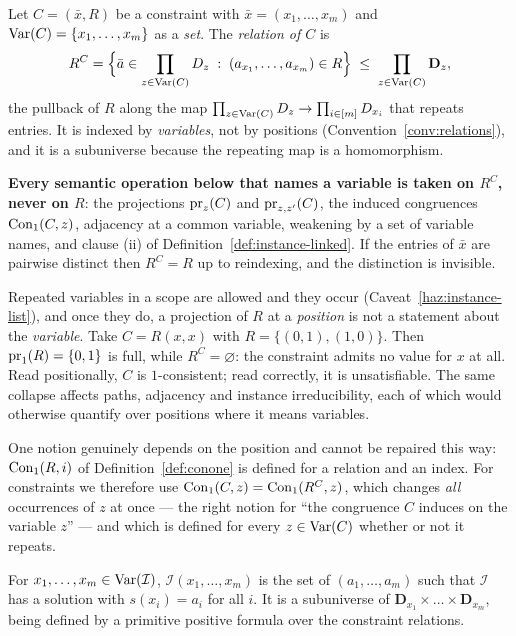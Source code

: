 \begin{definition}\label{def:constraint-relation}
Let $C=(\bar x,R)$ be a constraint with $\bar x=(x_{1},\dots,x_{m})$ and
$\operatorname{Var}(C)=\{x_{1},\dots,x_{m}\}$ as a \emph{set}. The \emph{relation of $C$} is
\[
  R^{C}=\Bigl\{\bar a\in\prod_{z\in\operatorname{Var}(C)}D_{z}\;:\;
    (a_{x_{1}},\dots,a_{x_{m}})\in R\Bigr\}
  \;\le\;\prod_{z\in\operatorname{Var}(C)}\mathbf D_{z},
\]
the pullback of $R$ along the map $\prod_{z\in\operatorname{Var}(C)}D_{z}\to
\prod_{i\in[m]}D_{x_{i}}$ that repeats entries. It is indexed by
\emph{variables}, not by positions (Convention~\ref{conv:relations}), and it is
a subuniverse because the repeating map is a homomorphism.

\textbf{Every semantic operation below that names a variable is taken on
$R^{C}$, never on $R$}: the projections $\operatorname*{pr}_{z}(C)$ and
$\operatorname*{pr}_{z,z'}(C)$, the induced congruences $\operatorname{Con}_1(C,z)$, adjacency at a
common variable, weakening by a set of variable names, and clause (ii) of
Definition~\ref{def:instance-linked}. If the entries of $\bar x$ are pairwise
distinct then $R^{C}=R$ up to reindexing, and the distinction is invisible.
\end{definition}

\begin{hazard}\label{haz:diagonal}
Repeated variables in a scope are allowed and they occur
(Caveat~\ref{haz:instance-list}), and once they do, a projection of $R$ at a
\emph{position} is not a statement about the \emph{variable}. Take
$C=R(x,x)$ with $R=\{(0,1),(1,0)\}$. Then $\operatorname*{pr}_{1}(R)=\{0,1\}$ is full,
while $R^{C}=\varnothing$: the constraint admits no value for $x$ at all. Read
positionally, $C$ is $1$-consistent; read correctly, it is unsatisfiable. The
same collapse affects paths, adjacency and instance irreducibility, each of
which would otherwise quantify over positions where it means variables.

One notion genuinely depends on the position and cannot be repaired this way:
$\operatorname{Con}_1(R,i)$ of Definition~\ref{def:conone} is defined for a relation and an
index. For constraints we therefore use $\operatorname{Con}_1(C,z)=\operatorname{Con}_1(R^{C},z)$, which
changes \emph{all} occurrences of $z$ at once --- the right notion for ``the
congruence $C$ induces on the variable $z$'' --- and which is defined for every
$z\in\operatorname{Var}(C)$ whether or not it repeats.
\end{hazard}

\begin{definition}\label{def:instance-relation}
For $x_{1},\dots,x_{m}\in\operatorname{Var}(\mathcal I)$, $\mathcal I(x_{1},\dots,x_{m})$ is
the set of $(a_{1},\dots,a_{m})$ such that $\mathcal I$ has a solution with
$s(x_{i})=a_{i}$ for all $i$. It is a subuniverse of
$\mathbf D_{x_{1}}\times\dots\times\mathbf D_{x_{m}}$, being defined by a
primitive positive formula over the constraint relations.
\end{definition}

